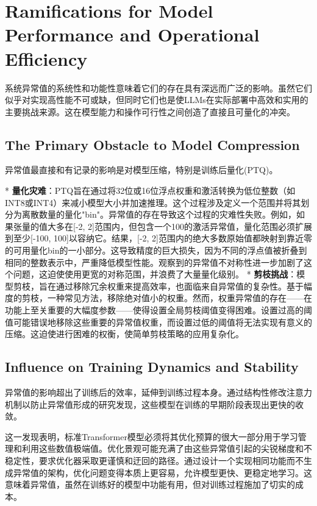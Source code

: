 \documentclass{article}
\begin{document}
\section{Ramifications for Model Performance and Operational Efficiency}

系统异常值的系统性和功能性意味着它们的存在具有深远而广泛的影响。虽然它们似乎对实现高性能不可或缺，但同时它们也是使LLMs在实际部署中高效和实用的主要挑战来源。这在模型能力和操作可行性之间创造了直接且可量化的冲突。

\subsection{The Primary Obstacle to Model Compression}

异常值最直接和有记录的影响是对模型压缩，特别是训练后量化(PTQ)。

* \textbf{量化灾难}：PTQ旨在通过将32位或16位浮点权重和激活转换为低位整数（如INT8或INT4）来减小模型大小并加速推理。这个过程涉及定义一个范围并将其划分为离散数量的量化"bin"。异常值的存在导致这个过程的灾难性失败。例如，如果张量的值大多在[-2, 2]范围内，但包含一个100的激活异常值，量化范围必须扩展到至少[-100, 100]以容纳它。结果，[-2, 2]范围内的绝大多数原始值都映射到靠近零的可用量化bin的一小部分。这导致精度的巨大损失，因为不同的浮点值被折叠到相同的整数表示中，严重降低模型性能。观察到的异常值不对称性进一步加剧了这个问题，这迫使使用更宽的对称范围，并浪费了大量量化级别。
* \textbf{剪枝挑战}：模型剪枝，旨在通过移除冗余权重来提高效率，也面临来自异常值的复杂性。基于幅度的剪枝，一种常见方法，移除绝对值小的权重。然而，权重异常值的存在——在功能上至关重要的大幅度参数——使得设置全局剪枝阈值变得困难。设置过高的阈值可能错误地移除这些重要的异常值权重，而设置过低的阈值将无法实现有意义的压缩。这迫使进行困难的权衡，使简单剪枝策略的应用复杂化。

\subsection{Influence on Training Dynamics and Stability}

异常值的影响超出了训练后的效率，延伸到训练过程本身。通过结构性修改注意力机制以防止异常值形成的研究发现，这些模型在训练的早期阶段表现出更快的收敛。

这一发现表明，标准Transformer模型必须将其优化预算的很大一部分用于学习管理和利用这些数值极端值。优化景观可能充满了由这些异常值引起的尖锐梯度和不稳定性，要求优化器采取更谨慎和迂回的路径。通过设计一个实现相同功能而不生成异常值的架构，优化问题变得本质上更容易，允许模型更快、更稳定地学习。这意味着异常值，虽然在训练好的模型中功能有用，但对训练过程施加了切实的成本。
\end{document}
